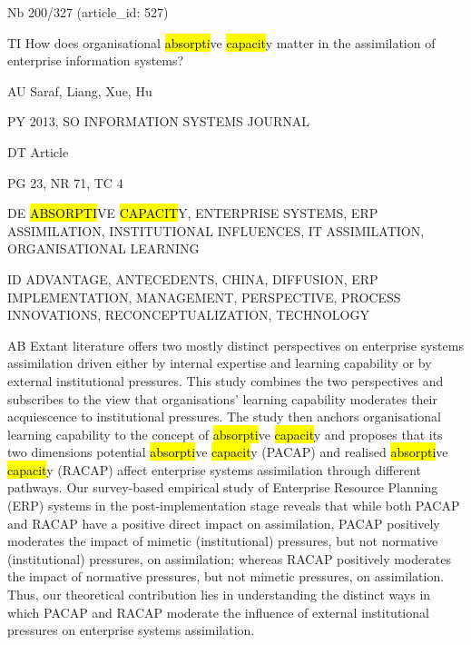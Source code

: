 \documentclass[a4paper]{article}
\begin{document}
\vspace*{-2cm}
Nb \tabto{0cm}200/327 (article\_id: 527)\par
TI \tabto{0cm}How does organisational \hl{absorpti}ve \hl{capacit}y matter in the assimilation of enterprise information systems?\par
AU \tabto{0cm}Saraf, Liang, Xue, Hu\par
PY \tabto{0cm}2013, SO INFORMATION SYSTEMS JOURNAL\par
DT \tabto{0cm}Article\par
PG \tabto{0cm}23, NR 71, TC 4\par
DE \tabto{0cm}\hl{ABSORPTI}VE \hl{CAPACIT}Y, ENTERPRISE SYSTEMS, ERP ASSIMILATION, INSTITUTIONAL INFLUENCES, IT ASSIMILATION, ORGANISATIONAL LEARNING\par
ID \tabto{0cm}ADVANTAGE, ANTECEDENTS, CHINA, DIFFUSION, ERP IMPLEMENTATION, MANAGEMENT, PERSPECTIVE, PROCESS INNOVATIONS, RECONCEPTUALIZATION, TECHNOLOGY\par
AB \tabto{0cm}Extant literature offers two mostly distinct perspectives on enterprise systems assimilation driven either by internal expertise and learning capability or by external institutional pressures. This study combines the two perspectives and subscribes to the view that organisations' learning capability moderates their acquiescence to institutional pressures. The study then anchors organisational learning capability to the concept of \hl{absorpti}ve \hl{capacit}y and proposes that its two dimensions potential \hl{absorpti}ve \hl{capacit}y (PACAP) and realised \hl{absorpti}ve \hl{capacit}y (RACAP) affect enterprise systems assimilation through different pathways. Our survey-based empirical study of Enterprise Resource Planning (ERP) systems in the post-implementation stage reveals that while both PACAP and RACAP have a positive direct impact on assimilation, PACAP positively moderates the impact of mimetic (institutional) pressures, but not normative (institutional) pressures, on assimilation; whereas RACAP positively moderates the impact of normative pressures, but not mimetic pressures, on assimilation. Thus, our theoretical contribution lies in understanding the distinct ways in which PACAP and RACAP moderate the influence of external institutional pressures on enterprise systems assimilation.\par
\clearpage
\end{document}
